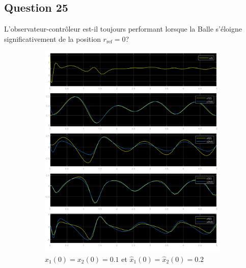 \documentclass[class=article, crop=false]{standalone}
\begin{document}
\subsection{Question 25}
\begin{exercise}
    L'observateur-contrôleur est-il toujours performant lorsque la Balle s'éloigne significativement de la position $r_{\text{ref}} = 0$?
\end{exercise}
\begin{resolution}
    \begin{figure}[H]
        \centering
        \begin{subfigure}[b]{0.475\textwidth}
            \centering
            \includegraphics[width=\textwidth]{../images/m5_r0.2_s0.1_o0.2.png}
            \caption{$x_1(0) = x_2(0) = 0.1$ et $\hat{x}_1(0) = \hat{x}_2(0) = 0.2$}
        \end{subfigure}
        \begin{subfigure}[b]{0.475\textwidth}
            \centering

\end{subfigure}
\end{figure}
\end{resolution}
\end{document}
